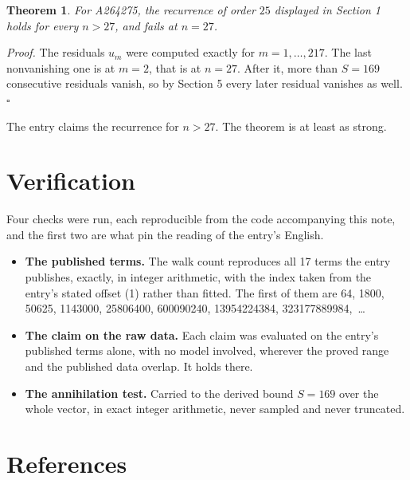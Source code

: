 \documentclass[11pt]{article}
\newtheorem{theorem}{Theorem}
\theoremstyle{definition}
\begin{document}
\begin{theorem} For A264275, the recurrence of order $25$ displayed in Section 1 holds for every $n > 27$, and fails at $n = 27$.\end{theorem}

{\itshape Proof.} The residuals $u_m$ were computed exactly for $m = 1,\dots,217$. The last nonvanishing one is at $m = 2$, that is at $n = 27$. After it, more than $S = 169$ consecutive residuals vanish, so by Section 5 every later residual vanishes as well. $\square$

The entry claims the recurrence for $n > 27$. The theorem is at least as strong.

\section{Verification}

Four checks were run, each reproducible from the code accompanying this note, and the first two are what pin the reading of the entry's English.

\begin{itemize}

\item {\bfseries The published terms.} The walk count reproduces all 17 terms the entry publishes, exactly, in integer arithmetic, with the index taken from the entry's stated offset (1) rather than fitted. The first of them are 64, 1800, 50625, 1143000, 25806400, 600090240, 13954224384, 323177889984,~\dots

\item {\bfseries The claim on the raw data.} Each claim was evaluated on the entry's published terms alone, with no model involved, wherever the proved range and the published data overlap. It holds there.

\item {\bfseries The annihilation test.} Carried to the derived bound $S = 169$ over the whole vector, in exact integer arithmetic, never sampled and never truncated.

\end{itemize}

\section{References}
\end{document}

